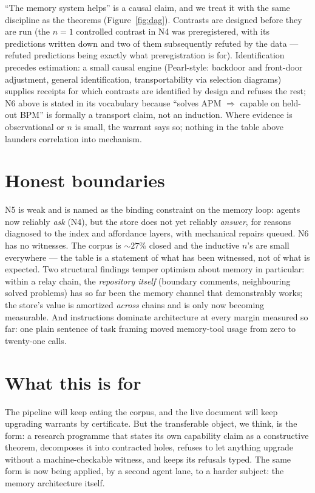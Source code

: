 \documentclass[11pt]{article}
\begin{document}
``The memory system helps'' is a causal claim, and we treat it with
the same discipline as the theorems (Figure~\ref{fig:dag}). Contrasts are designed before
they are run (the $n{=}1$ controlled contrast in N4 was
preregistered, with its predictions written down and two of them
subsequently refuted by the data --- refuted predictions being
exactly what preregistration is for). Identification precedes
estimation: a small causal engine (Pearl-style: backdoor and
front-door adjustment, general identification, transportability via
selection diagrams) supplies receipts for which contrasts are
identified by design and refuses the rest; N6 above is stated in its
vocabulary because ``solves APM $\Rightarrow$ capable on held-out
BPM'' is formally a transport claim, not an induction. Where evidence
is observational or $n$ is small, the warrant says so; nothing in
the table above launders correlation into mechanism.

\section{Honest boundaries}

N5 is weak and is named as the binding constraint on the memory loop:
agents now reliably \emph{ask} (N4), but the store does not yet
reliably \emph{answer}, for reasons diagnosed to the index and
affordance layers, with mechanical repairs queued. N6 has no
witnesses. The corpus is ${\sim}27\%$ closed and the inductive $n$'s
are small everywhere --- the table is a statement of what has been
witnessed, not of what is expected. Two structural findings temper
optimism about memory in particular: within a relay chain, the
\emph{repository itself} (boundary comments, neighbouring solved
problems) has so far been the memory channel that demonstrably works;
the store's value is amortized \emph{across} chains and is only now
becoming measurable. And instructions dominate architecture at every
margin measured so far: one plain sentence of task framing moved
memory-tool usage from zero to twenty-one calls.

\section{What this is for}

The pipeline will keep eating the corpus, and the live document will
keep upgrading warrants by certificate. But the transferable object,
we think, is the form: a research programme that states its own
capability claim as a constructive theorem, decomposes it into
contracted holes, refuses to let anything upgrade without a
machine-checkable witness, and keeps its refusals typed. The same
form is now being applied, by a second agent lane, to a harder
subject: the memory architecture itself.
\end{document}
